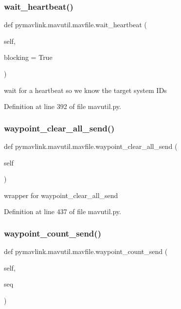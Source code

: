 \subsubsection{\texorpdfstring{wait\_heartbeat()}{wait\_heartbeat()}}
{\footnotesize\ttfamily def pymavlink.\+mavutil.\+mavfile.\+wait\+\_\+heartbeat (\begin{DoxyParamCaption}\item[{}]{self,  }\item[{}]{blocking = {\ttfamily True} }\end{DoxyParamCaption})}

\begin{DoxyVerb}wait for a heartbeat so we know the target system IDs\end{DoxyVerb}
 

Definition at line 392 of file mavutil.\+py.

\mbox{\label{classpymavlink_1_1mavutil_1_1mavfile_a3c9b70e6763649129f677074bd73e41a}} 
\subsubsection{\texorpdfstring{waypoint\_clear\_all\_send()}{waypoint\_clear\_all\_send()}}
{\footnotesize\ttfamily def pymavlink.\+mavutil.\+mavfile.\+waypoint\+\_\+clear\+\_\+all\+\_\+send (\begin{DoxyParamCaption}\item[{}]{self }\end{DoxyParamCaption})}

\begin{DoxyVerb}wrapper for waypoint_clear_all_send\end{DoxyVerb}
 

Definition at line 437 of file mavutil.\+py.

\mbox{\label{classpymavlink_1_1mavutil_1_1mavfile_a2d15b0cae8037dda7803879aa11a3857}} 
\subsubsection{\texorpdfstring{waypoint\_count\_send()}{waypoint\_count\_send()}}
{\footnotesize\ttfamily def pymavlink.\+mavutil.\+mavfile.\+waypoint\+\_\+count\+\_\+send (\begin{DoxyParamCaption}\item[{}]{self,  }\item[{}]{seq }\end{DoxyParamCaption})}

